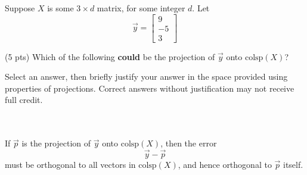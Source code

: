 \documentclass[11pt]{article}
\begin{document}
\begin{prob}[(13 pts)]
Suppose $X$ is some $3 \times d$ matrix, for some integer $d$. Let $$\vec y = \begin{bmatrix} 9 \\ -5 \\ 3 \end{bmatrix}$$

\begin{subprob}(5 pts) Which of the following \textbf{could} be the projection of $\vec y$ onto $\text{colsp}(X)$?
    
Select an answer, then briefly justify your answer in the space provided using properties of projections. Correct answers without justification may not receive full credit. \\

 \\ \\

\emptybox{3cm}
\begin{solution}
If $\vec p$ is the projection of $\vec y$ onto $\text{colsp}(X)$, then the error
\[
\vec y - \vec p
\]
must be orthogonal to all vectors in $\text{colsp}(X)$, and hence orthogonal to $\vec p$ itself.


\end{solution}
\end{subprob}
\end{prob}
\end{document}
